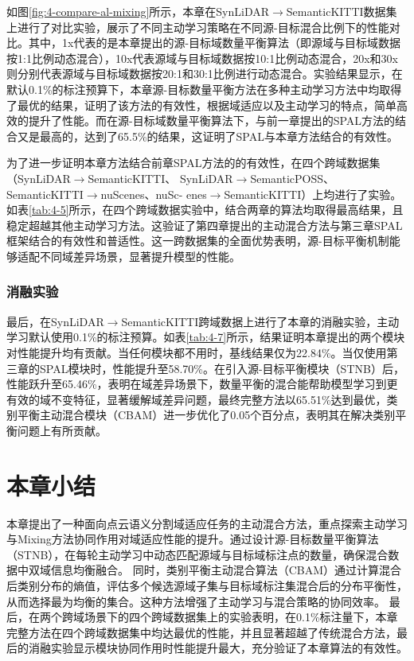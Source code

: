     \vspace{-0.35cm}
    如图\ref{fig:4-compare-al-mixing}所示，本章在SynLiDAR$\to$SemanticKITTI数据集上进行了对比实验，展示了不同主动学习策略在不同源-目标混合比例下的性能对比。其中，1x代表的是本章提出的源-目标域数量平衡算法（即源域与目标域数据按1:1比例动态混合），10x代表源域与目标域数据按10:1比例动态混合，20x和30x则分别代表源域与目标域数据按20:1和30:1比例进行动态混合。实验结果显示，在默认0.1\%的标注预算下，本章源-目标数量平衡方法在多种主动学习方法中均取得了最优的结果，证明了该方法的有效性，根据域适应以及主动学习的特点，简单高效的提升了性能。而在源-目标域数量平衡算法下，与前一章提出的SPAL方法的结合又是最高的，达到了65.5\%的结果，这证明了SPAL与本章方法结合的有效性。
    
    为了进一步证明本章方法结合前章SPAL方法的的有效性，在四个跨域数据集（SynLiDAR$\to$SemanticKITTI、
    SynLiDAR$\to$SemanticPOSS、SemanticKITTI$\to$nuScenes、nuSc-
    enes$\to$SemanticKITTI）上均进行了实验。如表\ref{tab:4-5}所示，在四个跨域数据实验中，结合两章的算法均取得最高结果，且稳定超越其他主动学习方法。这验证了第四章提出的主动混合方法与第三章SPAL框架结合的有效性和普适性。这一跨数据集的全面优势表明，源-目标平衡机制能够适配不同域差异场景，显著提升模型的性能。
    
    \subsubsection{消融实验}
    最后，在SynLiDAR$\to$SemanticKITTI跨域数据上进行了本章的消融实验，主动学习默认使用0.1\%的标注预算。如表\ref{tab:4-7}所示，结果证明本章提出的两个模块对性能提升均有贡献。当任何模块都不用时，基线结果仅为22.84\%。当仅使用第三章的SPAL模块时，性能提升至58.70\%。在引入源-目标平衡模块（STNB）后，性能跃升至65.46\%，表明在域差异场景下，数量平衡的混合能帮助模型学习到更有效的域不变特征，显著缓解域差异问题，最终完整方法以65.51\%达到最优，类别平衡主动混合模块（CBAM）进一步优化了0.05个百分点，表明其在解决类别平衡问题上有所贡献。
    
    \section{本章小结}
    本章提出了一种面向点云语义分割域适应任务的主动混合方法，重点探索主动学习与Mixing方法协同作用对域适应性能的提升。通过设计源-目标数量平衡算法（STNB），在每轮主动学习中动态匹配源域与目标域标注点的数量，确保混合数据中双域信息均衡融合。
    同时，类别平衡主动混合算法（CBAM）通过计算混合后类别分布的熵值，评估多个候选源域子集与目标域标注集混合后的分布平衡性，从而选择最为均衡的集合。这种方法增强了主动学习与混合策略的协同效率。
    最后，在两个跨域场景下的四个跨域数据集上的实验表明，在0.1\%标注量下，本章完整方法在四个跨域数据集中均达最优的性能，并且显著超越了传统混合方法，最后的消融实验显示模块协同作用时性能提升最大，充分验证了本章算法的有效性。
